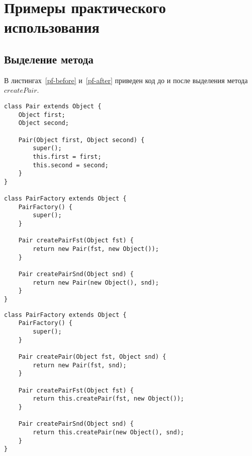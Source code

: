 \chapter{Примеры практического использования}

\section{Выделение метода}
В листингах~\ref{pf-before} и~\ref{pf-after} приведен код до и после выделения метода $createPair$.
\begin{lstlisting}[float,label=pf-before,caption=Код до выделения метода]
class Pair extends Object {
    Object first;
    Object second;

    Pair(Object first, Object second) {
        super();
        this.first = first;
        this.second = second;
    }
}

class PairFactory extends Object {
    PairFactory() {
        super();
    }

    Pair createPairFst(Object fst) {
        return new Pair(fst, new Object());
    }

    Pair createPairSnd(Object snd) {
        return new Pair(new Object(), snd);
    }
}
\end{lstlisting}

\begin{lstlisting}[float,label=pf-after,caption=Код после выделения метода]
class PairFactory extends Object {
    PairFactory() {
        super();
    }

    Pair createPair(Object fst, Object snd) {
    	return new Pair(fst, snd);
    }

    Pair createPairFst(Object fst) {
        return this.createPair(fst, new Object());
    }

    Pair createPairSnd(Object snd) {
        return this.createPair(new Object(), snd);
    }
}
\end{lstlisting}


